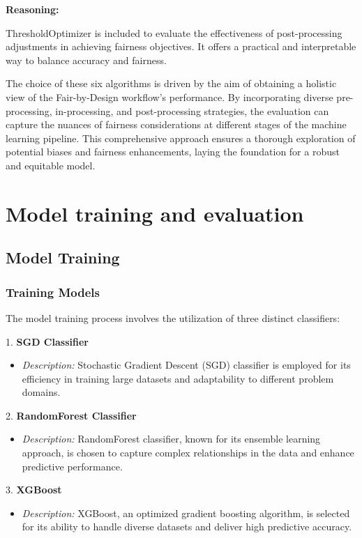 \textbf{Reasoning:}

ThresholdOptimizer is included to evaluate the effectiveness of post-processing adjustments in achieving fairness objectives. It offers a practical and interpretable way to balance accuracy and fairness.

The choice of these six algorithms is driven by the aim of obtaining a holistic view of the Fair-by-Design workflow's performance. By incorporating diverse pre-processing, in-processing, and post-processing strategies, the evaluation can capture the nuances of fairness considerations at different stages of the machine learning pipeline. This comprehensive approach ensures a thorough exploration of potential biases and fairness enhancements, laying the foundation for a robust and equitable model.

\section{Model training and evaluation}
\label{section:val_mt_eval}

\subsection{Model Training}

\subsubsection{Training Models}

The model training process involves the utilization of three distinct classifiers:

1. \textbf{SGD Classifier}
   \begin{itemize}
       \item \textit{Description:} Stochastic Gradient Descent (SGD) classifier is employed for its efficiency in training large datasets and adaptability to different problem domains.
   \end{itemize}

2. \textbf{RandomForest Classifier}
   \begin{itemize}
       \item \textit{Description:} RandomForest classifier, known for its ensemble learning approach, is chosen to capture complex relationships in the data and enhance predictive performance.
   \end{itemize}

3. \textbf{XGBoost}
   \begin{itemize}
       \item \textit{Description:} XGBoost, an optimized gradient boosting algorithm, is selected for its ability to handle diverse datasets and deliver high predictive accuracy.
   \end{itemize}

